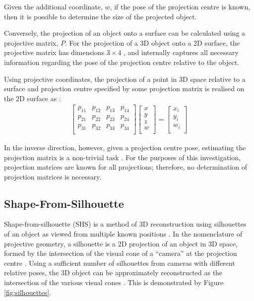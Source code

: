 Given the additional coordinate, $w$, if the pose of the projection centre is known, then it is possible to determine the size of the projected object.

Conversely, the projection of an object onto a surface can be calculated using a projective matrix, $P$. For the projection of a 3D object onto a 2D surface, the projective matrix has dimensions $3\times4$ \cite{lovell_2023b}, and internally captures all necessary information regarding the pose of the projection centre relative to the object.

Using projective coordinates, the projection of a point in 3D space relative to a surface and projection centre specified by some projection matrix is realised on the 2D surface as \cite{lovell_2023b}:
\begin{align} \label{eqn:projn}
  \begin{bmatrix}
    p_{11} & p_{12} & p_{13} & p_{14} \\
    p_{21} & p_{22} & p_{23} & p_{24} \\
    p_{31} & p_{32} & p_{33} & p_{34} \\
  \end{bmatrix}
  \begin{bmatrix}
    x \\
    y \\
    z \\
    w \\
  \end{bmatrix}
  =
  \begin{bmatrix}
    x_i \\
    y_i \\
    w_i \\
  \end{bmatrix}
\end{align}

In the inverse direction, however, given a projection centre pose, estimating the projection matrix is a non-trivial task \cite{lovell_2023b}. For the purposes of this investigation, projection matrices are known for all projections; therefore, no determination of projection matrices is necessary.

\newpage
\subsection{Shape-From-Silhouette}

Shape-from-silhouette (SHS) is a method of 3D reconstruction using silhouettes of an object as viewed from multiple known positions \cite{lovell_2023b}. In the nomenclature of projective geometry, a silhouette is a 2D projection of an object in 3D space, formed by the intersection of the visual cone of a ``camera'' at the projection centre \cite{cheung_2005}. Using a sufficient number of silhouettes from cameras with different relative poses, the 3D object can be approximately reconstructed as the intersection of the various visual cones \cite{lovell_2023b}. This is demonstrated by Figure \ref{fig:silhouettes}.

